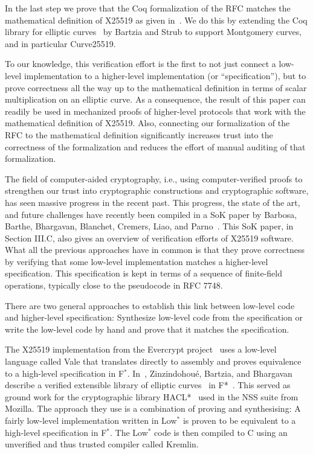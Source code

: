 In the last step we prove that the Coq formalization of the RFC matches
the mathematical definition of X25519 as given in~\cite[Sec.~2]{Ber06}.
We do this by extending the Coq library
for elliptic curves~\cite{BartziaS14} by Bartzia and Strub to
support Montgomery curves, and in particular Curve25519.

To our knowledge, this verification effort is the first to not just
connect a low-level implementation to a higher-level implementation (or ``specification''),
but to prove correctness all the way up
to the mathematical definition in terms of scalar multiplication on an elliptic curve.
As a consequence, the result of this paper can readily be used in mechanized proofs of
higher-level protocols that work with the mathematical definition of X25519.
Also, connecting our formalization of the RFC to the mathematical definition
significantly increases trust into the correctness of the formalization and
reduces the effort of manual auditing of that formalization.

The field of computer-aided cryptography, i.e., using computer-verified proofs
to strengthen our trust into cryptographic constructions and cryptographic software,
has seen massive progress in the recent past. This progress, the state of the art,
and future challenges have recently been compiled in a SoK paper by Barbosa,
Barthe, Bhargavan, Blanchet, Cremers, Liao, and Parno~\cite{BBB+19}.
This SoK paper, in Section III.C, also gives an overview of verification efforts of
X25519 software. What all the previous approaches have in common is that they
prove correctness by verifying that some low-level implementation matches a
higher-level specification. This specification is kept in terms of a sequence
of finite-field operations, typically close to the pseudocode in RFC 7748.

There are two general approaches to establish this link
between low-level code and higher-level specification:
Synthesize low-level code from the specification
or write the low-level code by hand and prove that it
matches the specification.

The X25519 implementation from the Evercrypt project~\cite{EverCrypt}
uses a low-level language called Vale that translates
directly to assembly and proves equivalence to a high-level specification in F$^*$.
In~\cite{Zinzindohoue2016AVE}, Zinzindohou{\'{e}}, Bartzia, and Bhargavan
describe a verified extensible library of elliptic curves~ in F*~\cite{DBLP:journals/corr/BhargavanDFHPRR17}.
This served as ground work for the cryptographic library HACL*~\cite{zinzindohoue2017hacl}
used in the NSS suite from Mozilla. The approach they use is a combination
of proving and synthesising: A fairly low-level implementation written in
Low$^*$ is proven to be equivalent to a high-level specification in F$^*$.
The Low$^*$ code is then compiled to C using an unverified and thus trusted
compiler called Kremlin.

